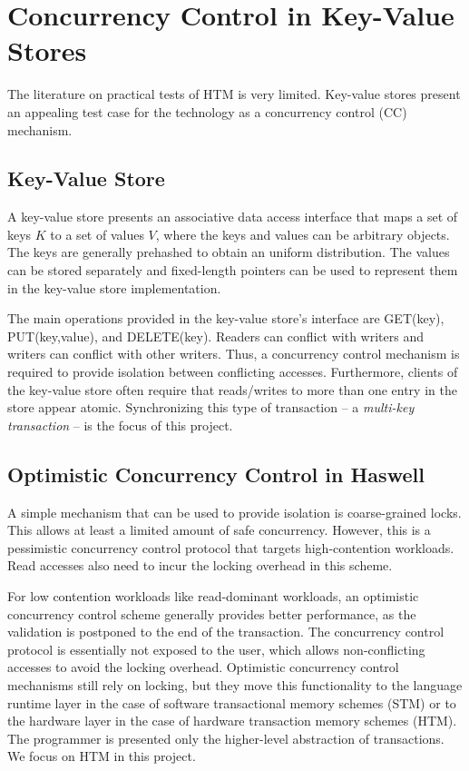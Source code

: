 \section{Concurrency Control in Key-Value Stores} \label{sec:tm}

The literature on practical tests of HTM is very limited. Key-value stores
present an appealing test case for the technology as a concurrency control (CC)
mechanism.

\subsection{Key-Value Store}

A key-value store presents an associative data access interface that maps a set
of keys $K$ to a set of values $V$, where the keys and values can be arbitrary
objects. The keys are generally prehashed to obtain an uniform distribution. The
values can be stored separately and fixed-length pointers can be used to
represent them in the key-value store implementation.  

The main operations provided in the key-value store's interface are
\textsc{GET}(key), \textsc{PUT}(key,value), and \textsc{DELETE}(key). Readers
can conflict with writers and writers can conflict with other writers. Thus, a
concurrency control mechanism is required to provide isolation between
conflicting accesses. Furthermore, clients of the key-value store often require
that reads/writes to more than one entry in the store appear
atomic. Synchronizing this type of transaction -- a \textit{multi-key
transaction} -- is the focus of this project.

\subsection{Optimistic Concurrency Control in Haswell}

A simple mechanism that can be used to provide isolation is coarse-grained
locks. This allows at least a limited amount of safe concurrency.  However,
this is a pessimistic concurrency control protocol that targets high-contention
workloads. Read accesses also need to incur the locking overhead in this scheme.

For low contention workloads like read-dominant workloads, an optimistic
concurrency control scheme generally provides better performance, as the
validation is postponed to the end of the transaction. The concurrency control
protocol is essentially not exposed to the user, which allows non-conflicting
accesses to avoid the locking overhead.  Optimistic concurrency control
mechanisms still rely on locking, but they move this functionality to the
language runtime layer in the case of software transactional memory schemes
(STM) or to the hardware layer in the case of hardware transaction memory
schemes (HTM). The programmer is presented only the higher-level abstraction of
transactions. We focus on HTM in this project.

